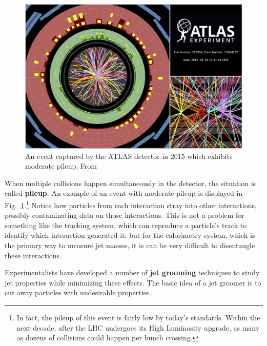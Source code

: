 \documentclass[../thesis.tex]{subfiles}
\begin{document}
	\begin{figure}
	\begin{center}
		\includegraphics[width=\textwidth]{figures/atlas_pile_up.jpeg}
		\caption{\label{technical-fig:pileup}An event captured by the ATLAS detector in 2015 which exhibits moderate pileup. From \cite{atlas_collaboration_event_nodate-1}}
	\end{center}
	\end{figure}

	When multiple collisions happen simultaneously in the detector, the situation is called \textbf{pileup}. An example of an event with moderate pileup is displayed in Fig.~\ref{technical-fig:pileup}.\footnote{In fact, the pileup of this event is fairly low by today's standards. Within the next decade, after the LHC undergoes its High Luminosity upgrade, as many as dozens of collisions could happen per bunch crossing.} Notice how particles from each interaction stray into other interactions, possibly contaminating data on those interactions. This is not a problem for something like the tracking system, which can reproduce a particle's track to identify which interaction generated it; but for the calorimetry system, which is the primary way to measure jet masses, it is can be very difficult to disentangle these interactions.

	Experimentalists have developed a number of \textbf{jet grooming} techniques to study jet properties while minimizing these effects. The basic idea of a jet groomer is to cut away particles with undesirable properties.
\end{document}
